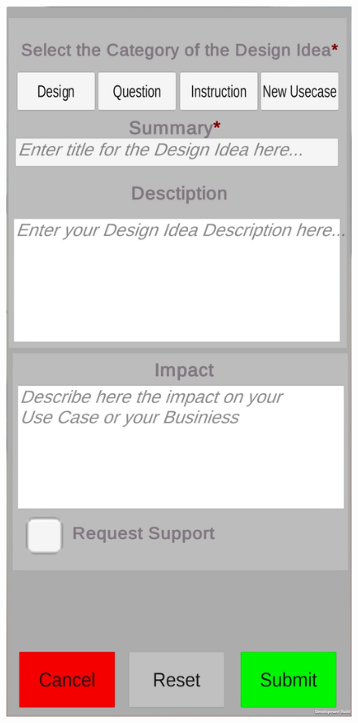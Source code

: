 \begin{figure}[H]
	\label{tab:example}
	\centering
	\begin{minipage}{.45\textwidth}
		\centering
		\includegraphics[width=.95\linewidth]{resources/implementation/firstform.jpg}

\end{minipage}
\end{figure}
